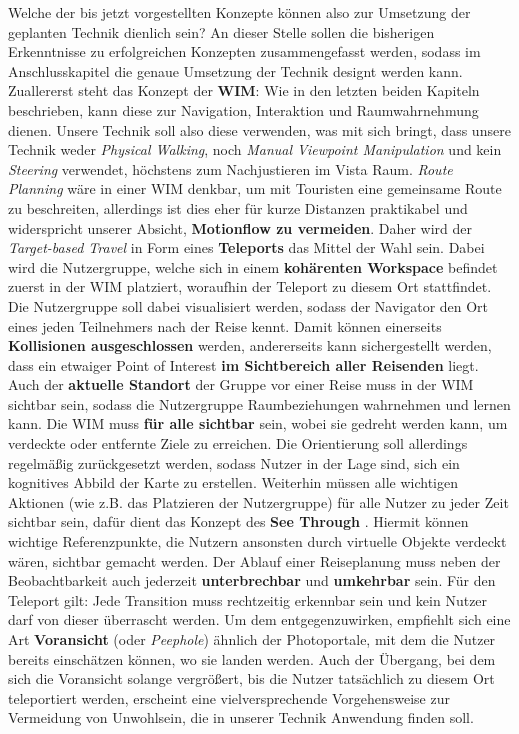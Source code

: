 Welche der bis jetzt vorgestellten Konzepte können also zur Umsetzung der geplanten Technik dienlich sein? An dieser Stelle sollen die bisherigen Erkenntnisse zu erfolgreichen Konzepten zusammengefasst werden, sodass im Anschlusskapitel die genaue Umsetzung der Technik designt werden kann.
Zuallererst steht das Konzept der \textbf{WIM}: Wie in den letzten beiden Kapiteln beschrieben, kann diese zur Navigation, Interaktion und Raumwahrnehmung dienen. 
Unsere Technik soll also diese verwenden, was mit sich bringt, dass unsere Technik weder \textit{Physical Walking}, noch \textit{Manual Viewpoint Manipulation} und kein \textit{Steering} verwendet, höchstens zum Nachjustieren im Vista Raum. \textit{Route Planning} wäre in einer WIM denkbar, um mit Touristen eine gemeinsame Route zu beschreiten, allerdings ist dies eher für kurze Distanzen praktikabel und widerspricht unserer Absicht, \textbf{Motionflow zu vermeiden}. Daher wird der \textit{Target-based Travel} in Form eines \textbf{Teleports} das Mittel der Wahl sein. Dabei wird die Nutzergruppe, welche sich in einem \textbf{kohärenten Workspace} befindet zuerst in der WIM platziert, woraufhin der Teleport zu diesem Ort stattfindet.
Die Nutzergruppe soll dabei visualisiert werden, sodass der Navigator den Ort eines jeden Teilnehmers nach der Reise kennt. Damit können einerseits \textbf{Kollisionen ausgeschlossen} werden, andererseits kann sichergestellt werden, dass ein etwaiger Point of Interest \textbf{im Sichtbereich aller Reisenden} liegt. Auch der \textbf{aktuelle Standort} der Gruppe vor einer Reise muss in der WIM sichtbar sein, sodass die Nutzergruppe Raumbeziehungen wahrnehmen und lernen kann. Die WIM muss \textbf{für alle sichtbar} sein, wobei sie gedreht werden kann, um verdeckte oder entfernte Ziele zu erreichen. Die Orientierung soll allerdings regelmäßig zurückgesetzt werden, sodass Nutzer in der Lage sind, sich ein kognitives Abbild der Karte zu erstellen.  Weiterhin müssen alle wichtigen Aktionen (wie z.B. das Platzieren der Nutzergruppe) für alle Nutzer zu jeder Zeit sichtbar sein, dafür dient das Konzept des \textbf{See Through} \cite{Argelaguet2011See-throughReality}. Hiermit können wichtige Referenzpunkte, die Nutzern ansonsten durch virtuelle Objekte verdeckt wären, sichtbar gemacht werden.
Der Ablauf einer Reiseplanung muss neben der Beobachtbarkeit auch jederzeit \textbf{unterbrechbar} und \textbf{umkehrbar} sein. Für den Teleport gilt: Jede Transition muss rechtzeitig erkennbar sein und kein Nutzer darf von dieser überrascht werden.
Um dem entgegenzuwirken, empfiehlt sich eine Art \textbf{Voransicht} (oder \textit{Peephole}) ähnlich der Photoportale, mit dem die Nutzer bereits einschätzen können, wo sie landen werden. Auch der Übergang, bei dem sich die Voransicht solange vergrößert, bis die Nutzer tatsächlich zu diesem Ort teleportiert werden, erscheint eine vielversprechende Vorgehensweise zur Vermeidung von Unwohlsein, die in unserer Technik Anwendung finden soll.
